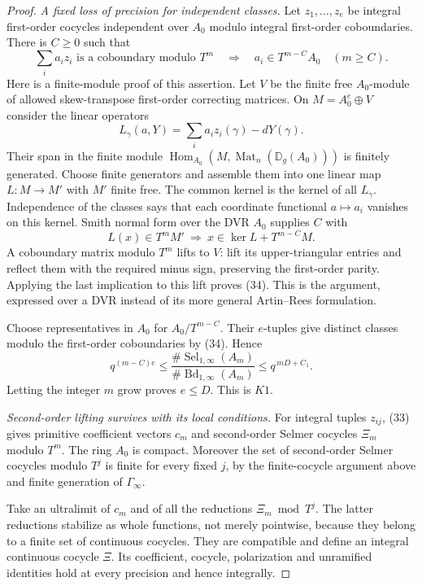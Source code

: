 \begin{proof}
\emph{A fixed loss of precision for independent classes.}
Let $z_1,\ldots,z_e$ be integral first-order cocycles independent
over $A_0$ modulo integral first-order coboundaries.
There is $C\geq0$ such that
\[
 \sum_i a_i z_i\text{ is a coboundary modulo }T^m
       \quad\Longrightarrow\quad
                         a_i\in T^{m-C}A_0\quad(m\geq C).       \tag{34}
\]
Here is a finite-module proof of this assertion.
Let $V$ be the finite free $A_0$-module of allowed
skew-transpose first-order correcting matrices.
On $M=A_0^e\oplus V$ consider the linear operators
\[
        L_\gamma(a,Y)=\sum_i a_i z_i(\gamma)-dY(\gamma).
\]
Their span in the finite module
$\operatorname{Hom}_{A_0}(M,\operatorname{Mat}_n(\mathbb D_g(A_0)))$
is finitely generated.  Choose finite generators and assemble
them into one linear map $L:M\to M'$ with $M'$ finite free.
The common kernel is the kernel of all $L_\gamma$.
Independence of the classes says that each coordinate
functional $a\mapsto a_i$ vanishes on this kernel.
Smith normal form over the DVR $A_0$ supplies $C$ with
\[
       L(x)\in T^mM'
                 \ \Longrightarrow\
       x\in\ker L+T^{m-C}M.
\]
A coboundary matrix modulo $T^m$ lifts to $V$:
lift its upper-triangular entries and reflect them with the
required minus sign, preserving the first-order parity.
Applying the last implication to this lift proves (34).
This is the 
argument, expressed over a DVR instead of its more general
Artin--Rees formulation.

Choose representatives in $A_0$ for $A_0/T^{m-C}$.
Their $e$-tuples give distinct classes modulo the first-order
coboundaries by (34).  Hence
\[
        q^{(m-C)e}
       \leq
       \frac{\#\operatorname{Sel}_{1,\infty}(A_m)}
            {\#\operatorname{Bd}_{1,\infty}(A_m)}
       \leq q^{\,mD+C_1}.
\]
Letting the integer $m$ grow proves $e\leq D$.  This is $K1$.

\emph{Second-order lifting survives with its local conditions.}
For integral tuples $z_{ij}$, (33) gives primitive coefficient
vectors $c_m$ and second-order Selmer cocycles $\Xi_m$ modulo
$T^m$.  The ring $A_0$ is compact.
Moreover the set of second-order Selmer cocycles modulo
$T^j$ is finite for every fixed $j$, by the finite-cocycle
argument above and finite generation of $\Gamma_\infty$.

Take an ultralimit of $c_m$ and of all the reductions
$\Xi_m\bmod T^j$.  The latter reductions stabilize as whole
functions, not merely pointwise, because they belong to a
finite set of continuous cocycles.
They are compatible and define an integral continuous
cocycle $\Xi$.
Its coefficient, cocycle, polarization and unramified identities
hold at every precision and hence integrally.


\end{proof}
